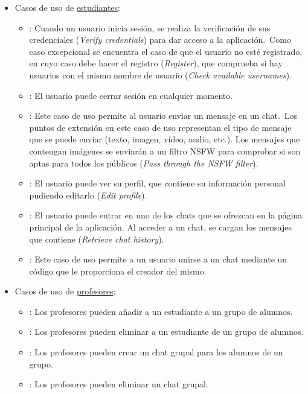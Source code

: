 \begin{itemize}
	\item Casos de uso de \underline{estudiantes}:
	\begin{itemize}
		\item {}:
		Cuando un usuario inicia sesión, se realiza la verificación de sus credenciales (\textit{Verify credentials})
		para dar acceso a la aplicación.\ Como caso excepcional se encuentra el caso de que el usuario no esté
		registrado, en cuyo caso debe hacer el registro (\textit{Register}), que comprueba si hay usuarios con el mismo
		nombre de usuario (\textit{Check available usernames}).
		\item {}:
		El usuario puede cerrar sesión en cualquier momento.
		\item {}:
		Este caso de uso permite al usuario enviar un mensaje en un chat.\ Los puntos de extensión en este caso de uso
		representan el tipo de mensaje que se puede enviar (texto, imagen, vídeo, audio, etc.).
		Los mensajes que contengan imágenes se enviarán a un filtro NSFW para comprobar si son aptas para todos los
		públicos (\textit{Pass through the NSFW filter}).
		\item {}:
		El usuario puede ver su perfil, que contiene su información personal pudiendo editarlo (\textit{Edit profile}).
		\item {}:
		El usuario puede entrar en uno de los chats que se ofrezcan en la página principal de la aplicación.
		Al acceder a un chat, se cargan los mensajes que contiene (\textit{Retrieve chat history}).
		\item {}:
		Este caso de uso permite a un usuario unirse a un chat mediante un código que le proporciona el creador del
		mismo.
	\end{itemize}

	\item Casos de uso de \underline{profesores}:
	\begin{itemize}
		\item {}:
		Los profesores pueden añadir a un estudiante a un grupo de alumnos.
		\item {}:
		Los profesores pueden eliminar a un estudiante de un grupo de alumnos.
		\item {}:
		Los profesores pueden crear un chat grupal para los alumnos de un grupo.
		\item {}:
		Los profesores pueden eliminar un chat grupal.
	\end{itemize}


\end{itemize}
